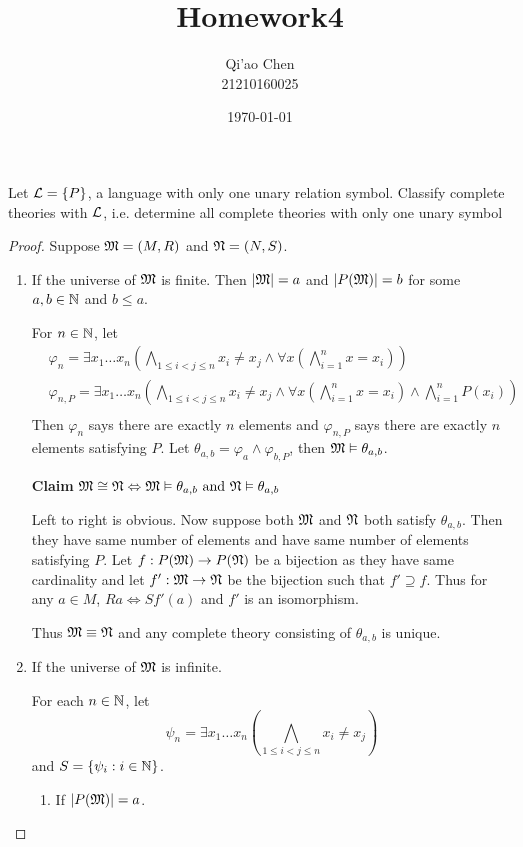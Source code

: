 \documentclass[11pt]{article}
\author{Qi'ao Chen\\21210160025}
\date{\today}
\title{Homework4}
\begin{document}
\maketitle
\begin{exercise}
Let \(\mathcal{L}=\{P\}\), a language with only one unary relation symbol. Classify complete theories
with \(\mathcal{L}\), i.e. determine all complete theories with only one unary symbol
\end{exercise}

\begin{proof}
Suppose \(\mathfrak{M}=(M,R)\) and \(\mathfrak{N}=(N,S)\).

\begin{enumerate}
\item If the universe of \(\mathfrak{M}\) is finite. Then \(\abs{\fM}=a\) and \(\abs{P(\fM)}=b\) for some \(a,b\in\mathbb{N}\)
and \(b\le a\).

For \(n\in\mathbb{N}\), let
\begin{align*}
&\varphi_n=\exists x_1\dots x_n(\bigwedge_{1\le i<j\le n}x_i\neq x_j\wedge\forall x(\bigwedge_{i=1}^nx=x_i))\\
&\varphi_{n,P}=\exists x_1\dots x_n(\bigwedge_{1\le i<j\le n}x_i\neq x_j\wedge\forall x(\bigwedge_{i=1}^nx=x_i)\wedge\bigwedge_{i=1}^nP(x_i))\\
\end{align*}
Then \(\varphi_n\) says there are exactly \(n\) elements and \(\varphi_{n,P}\) says there are exactly \(n\)
elements satisfying \(P\). Let \(\theta_{a,b}=\varphi_a\wedge\varphi_{b,P}\), then \(\mathfrak{M}\vDash\theta_{a,b}\).

\textbf{Claim} \(\mathfrak{M}\cong\mathfrak{N}\Leftrightarrow \mathfrak{M}\vDash\theta_{a,b}\text{ and }\mathfrak{N}\vDash\theta_{a,b}\)

Left to right is obvious. Now suppose both \(\mathfrak{M}\) and \(\mathfrak{N}\) both satisfy \(\theta_{a,b}\). Then they
have same number of elements and have same number of elements satisfying \(P\).
Let \(f:P(\mathfrak{M})\to P(\mathfrak{N})\) be a bijection as they have same cardinality and let \(f':\mathfrak{M}\to\mathfrak{N}\) be the
bijection such that \(f'\supseteq f\). Thus for any \(a\in M\), \(Ra\Leftrightarrow Sf'(a)\) and \(f'\) is an isomorphism.

Thus \(\mathfrak{M}\equiv\mathfrak{N}\) and any complete theory consisting of \(\theta_{a,b}\) is unique.

\item If the universe of \(\mathfrak{M}\) is infinite.

For each \(n\in\mathbb{N}\), let
\begin{equation*}
\psi_n=\exists x_1\dots x_n(\bigwedge_{1\le i<j\le n}x_i\neq x_j)
\end{equation*}
and \(S=\{\psi_i:i\in\mathbb{N}\}\).
\begin{enumerate}
\item If \(\abs{P(\fM)}=a\).


\end{enumerate}
\end{enumerate}
\end{proof}
\end{document}
